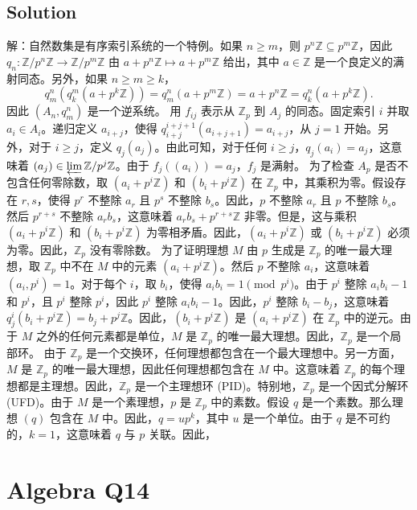\documentclass[12pt]{book}
\begin{document}
\subsection*{Solution}
解：自然数集是有序索引系统的一个特例。如果 $n \ge m$，则 $p^n\mathbb{Z} \subseteq p^m\mathbb{Z}$，因此 $q_n: \mathbb{Z}/p^n\mathbb{Z} \to \mathbb{Z}/p^m\mathbb{Z}$ 由 $a + p^n\mathbb{Z} \mapsto a + p^m\mathbb{Z}$ 给出，其中 $a \in \mathbb{Z}$ 是一个良定义的满射同态。另外，如果 $n \ge m \ge k$，
\[q_m^n(q_k^m(a + p^k\mathbb{Z})) = q_m^n(a + p^m\mathbb{Z}) = a + p^n\mathbb{Z} = q_k^n(a + p^k\mathbb{Z}).\]
因此 $(A_n, q_m^n)$ 是一个逆系统。
用 $f_{ij}$ 表示从 $\mathbb{Z}_p$ 到 $A_j$ 的同态。固定索引 $i$ 并取 $a_i \in A_i$。递归定义 $a_{i+j}$，使得 $q_{i+j}^{i+j+1}(a_{i+j+1}) = a_{i+j}$，从 $j=1$ 开始。另外，对于 $i \ge j$，定义 $q_j(a_j)$。由此可知，对于任何 $i \ge j$，$q_j(a_i) = a_j$，这意味着 $(a_j) \in \varprojlim \mathbb{Z}/p^j\mathbb{Z}$。由于 $f_j((a_i)) = a_j$，$f_j$ 是满射。
为了检查 $A_p$ 是否不包含任何零除数，取 $(a_i + p^i\mathbb{Z})$ 和 $(b_i + p^i\mathbb{Z})$ 在 $\mathbb{Z}_p$ 中，其乘积为零。假设存在 $r,s$，使得 $p^r$ 不整除 $a_r$ 且 $p^s$ 不整除 $b_s$。因此，$p$ 不整除 $a_r$ 且 $p$ 不整除 $b_s$。然后 $p^{r+s}$ 不整除 $a_r b_s$，这意味着 $a_r b_s + p^{r+s}\mathbb{Z}$ 非零。但是，这与乘积 $(a_i + p^i\mathbb{Z})$ 和 $(b_i + p^i\mathbb{Z})$ 为零相矛盾。因此，$(a_i + p^i\mathbb{Z})$ 或 $(b_i + p^i\mathbb{Z})$ 必须为零。因此，$\mathbb{Z}_p$ 没有零除数。
为了证明理想 $M$ 由 $p$ 生成是 $\mathbb{Z}_p$ 的唯一最大理想，取 $\mathbb{Z}_p$ 中不在 $M$ 中的元素 $(a_i + p^i\mathbb{Z})$。然后 $p$ 不整除 $a_i$，这意味着 $(a_i, p^i) = 1$。对于每个 $i$，取 $b_i$，使得 $a_i b_i = 1 \pmod{p^i}$。由于 $p^i$ 整除 $a_i b_i - 1$ 和 $p^i$，且 $p^i$ 整除 $p^i$，因此 $p^i$ 整除 $a_i b_i - 1$。因此，$p^i$ 整除 $b_i - b_j$，这意味着 $q_j^i(b_i + p^i\mathbb{Z}) = b_j + p^j\mathbb{Z}$。因此，$(b_i + p^i\mathbb{Z})$ 是 $(a_i + p^i\mathbb{Z})$ 在 $\mathbb{Z}_p$ 中的逆元。由于 $M$ 之外的任何元素都是单位，$M$ 是 $\mathbb{Z}_p$ 的唯一最大理想。因此，$\mathbb{Z}_p$ 是一个局部环。
由于 $\mathbb{Z}_p$ 是一个交换环，任何理想都包含在一个最大理想中。另一方面，$M$ 是 $\mathbb{Z}_p$ 的唯一最大理想，因此任何理想都包含在 $M$ 中。这意味着 $\mathbb{Z}_p$ 的每个理想都是主理想。因此，$\mathbb{Z}_p$ 是一个主理想环 (PID)。特别地，$\mathbb{Z}_p$ 是一个因式分解环 (UFD)。由于 $M$ 是一个素理想，$p$ 是 $\mathbb{Z}_p$ 中的素数。假设 $q$ 是一个素数。那么理想 $(q)$ 包含在 $M$ 中。因此，$q = up^k$，其中 $u$ 是一个单位。由于 $q$ 是不可约的，$k=1$，这意味着 $q$ 与 $p$ 关联。因此，
\newpage
\section{Algebra Q14}
\end{document}
